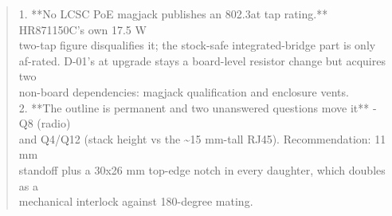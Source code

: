 \documentclass[11pt,a4paper]{article}
\begin{document}
\begin{quote}
1. {*}{*}No LCSC PoE magjack publishes an 802.3at tap rating.{*}{*} HR871150C's own 17.5 W\\
   two-tap figure disqualifies it; the stock-safe integrated-bridge part is only\\
   af-rated. D-01's at upgrade stays a board-level resistor change but acquires two\\
   non-board dependencies: magjack qualification and enclosure vents.\\
2. {*}{*}The outline is permanent and two unanswered questions move it{*}{*} - Q8 (radio)\\
   and Q4/Q12 (stack height vs the \textasciitilde{}15 mm-tall RJ45). Recommendation: 11 mm\\
   standoff plus a 30x26 mm top-edge notch in every daughter, which doubles as a\\
   mechanical interlock against 180-degree mating.
\end{quote}
\end{document}
